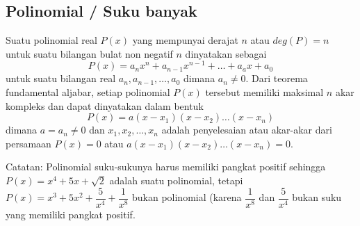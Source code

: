 \subsection{Polinomial / Suku banyak}
Suatu polinomial real $P(x)$ yang mempunyai derajat $n$ atau $deg(P) = n$ untuk suatu bilangan bulat non negatif $n$ dinyatakan sebagai
$$P(x)=a_nx^n+a_{n-1}x^{n-1}+\dots+a_ax+a_0$$
untuk suatu bilangan real $a_n,a_{n-1},\dots,a_0$ dimana $a_n \neq 0$. Dari teorema fundamental aljabar, setiap polinomial $P(x)$ tersebut memiliki maksimal $n$ akar kompleks dan dapat dinyatakan dalam bentuk
$$P(x)=a(x-x_1)(x-x_2)\dots(x-x_n)$$
dimana $a = a_n \neq 0$ dan $x_1,x_2,\dots,x_n$ adalah penyelesaian atau akar-akar dari persamaan $P(x)=0$ atau $a(x-x_1)(x-x_2)\dots(x-x_n)=0$.

Catatan: Polinomial suku-sukunya harus memiliki pangkat positif sehingga $P(x)=x^4+5x+\sqrt{2}$ adalah suatu polinomial, tetapi $P(x)=x^3+5x^2+\dfrac{5}{x^4}+\dfrac{1}{x^8}$ bukan polinomial (karena $\dfrac{1}{x^8}$ dan $\dfrac{5}{x^4}$ bukan suku yang memiliki pangkat positif.




